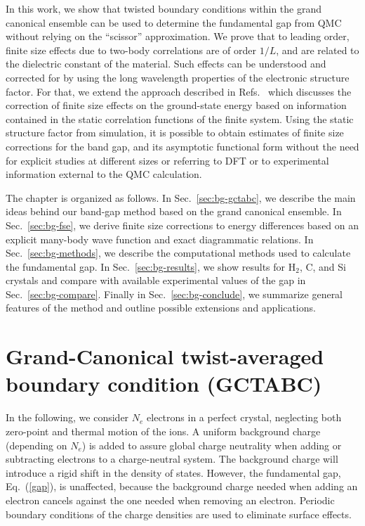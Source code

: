 In this work, we show that twisted boundary conditions within the grand canonical ensemble
can be used
to  determine the fundamental gap from QMC without relying on the ``scissor'' approximation.
We prove that to leading order, finite size effects due to two-body correlations are of order $1/L$,
and are related to the dielectric constant of the material. Such effects
can be understood and corrected for by using
the long wavelength properties of the electronic
structure factor. 
For that, we extend the approach described in Refs.~\cite{fse,finitesize} 
which discusses the correction
of finite size effects on the ground-state energy
based on information contained in the static correlation functions of the finite system.
Using the static structure factor from simulation, it is possible to obtain estimates of finite size corrections 
for the band gap, and its asymptotic functional form 
without the need for
explicit studies at different sizes or referring to DFT or to experimental information
external to the QMC calculation.

The chapter is organized as follows. In Sec.~\ref{sec:bg-gctabc}, we describe the main ideas behind our band-gap method based on the grand canonical ensemble. In Sec.~\ref{sec:bg-fse}, we derive finite size corrections to energy differences based on an explicit many-body wave function and exact diagrammatic relations. In Sec.~\ref{sec:bg-methods}, we describe the computational methods used to calculate the fundamental gap. In Sec.~\ref{sec:bg-results}, we show results for H$_2$, C, and Si crystals
and compare with available experimental values of the gap in Sec.~\ref{sec:bg-compare}.
Finally in Sec.~\ref{sec:bg-conclude}, we summarize general features of the method
 and outline possible extensions and applications.

\section{Grand-Canonical twist-averaged boundary condition (GCTABC)\label{sec:bg-gctabc}}

In the following, we consider $N_e$ electrons in a perfect crystal,
neglecting both zero-point and thermal motion of the ions.
A uniform background charge (depending on $N_e$) is added to assure global 
charge neutrality when adding or subtracting electrons to a charge-neutral system.
The background charge will introduce a rigid shift in the density of states. However, the fundamental gap, Eq.~(\ref{gap}), is unaffected,
because the background
charge needed when adding an electron cancels against the one needed when removing an electron.
Periodic boundary conditions of the charge densities are used to eliminate surface effects.

